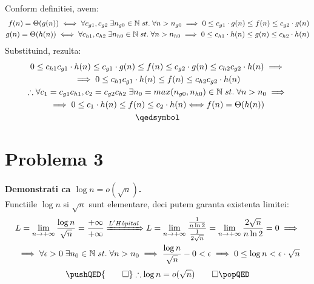 \documentclass[12pt]{article}
\begin{document}
Conform definitiei, avem: \\
\begin{equation*}
\begin{split}
f(n) = \Theta(g(n)) \iff \forall c_{g1},c_{g2}\; \exists n_{g0} \in \mathbb{N} \; st. \; \forall n > n_{g0} \implies 0 \leq c_{g1} \cdot g(n) \leq f(n) \leq c_{g2} \cdot g(n) \\
g(n) = \Theta(h(n)) \iff \forall c_{h1},c_{h2}\; \exists n_{h0} \in \mathbb{N} \; st. \; \forall n > n_{h0} \implies 0 \leq c_{h1} \cdot h(n) \leq g(n) \leq c_{h2} \cdot h(n)
\end{split}
\\
\end{equation*}
Substituind, rezulta: \\
\begin{multline*}
0 \leq c_{h1} c_{g1} \cdot h(n) \leq c_{g1} \cdot g(n) \leq f(n) \leq c_{g2} \cdot g(n) \leq c_{h2} c_{g2} \cdot h(n) \implies \\
\implies 0 \leq c_{h1} c_{g1} \cdot h(n) \leq f(n)  \leq c_{h2} c_{g2} \cdot h(n) \\
\therefore \forall c_{1} = c_{g1} c_{h1},c_{2} = c_{g2} c_{h2} \; \exists n_{0} = max(n_{g0}, n_{h0}) \in \mathbb{N} \; st. \; \forall n > n_{0} \implies \\ \implies 0 \leq c_{1} \cdot h(n) \leq f(n)  \leq c_{2} \cdot h(n) \Longleftrightarrow f(n) = \Theta(h(n)) \\
\qedsymbol
\end{multline*}

\newpage 

\section*{Problema 3}
{\bfseries Demonstrati ca $\log{n} = o(\sqrt{n})$.} \\
Functiile $\log{n}$ si $\sqrt{n}$ sunt elementare, deci putem garanta existenta limitei:
\begin{equation*}
\begin{split}
    L = \lim_{n \to +\infty} {\frac{\log{n}}{\sqrt{n}}} = \frac{+\infty}{+\infty} \xRightarrow{L'H\hat{o}pital} L = \lim_{n \to +\infty} {\frac{\frac{1}{n \ln{2}}}{\frac{1}{2 \sqrt{n}}}} = \lim_{n \to +\infty} \frac{2\sqrt{n}}{n\ln{2}} = 0 \implies \\
    \implies \forall \epsilon > 0 \; \exists n_0 \in \mathbb{N} \; st. \; \forall n > n_0 \implies \frac{\log{n}}{\sqrt{n}} - 0 < \epsilon \implies 0 \leq \log{n} < \epsilon \cdot \sqrt{n} \\
\end{split}
\end{equation*}
\begin{equation*}
    \pushQED{\qed} 
    \therefore \log{n} = o(\sqrt{n}) \qedhere
    \popQED
\end{equation*}
\end{document}

